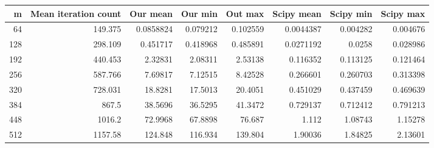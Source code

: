 \begin{tabular}{rrrrrrrr}
\hline
   m &   Mean iteration count &    Our mean &    Our min &    Out max &   Scipy mean &   Scipy min &   Scipy max \\
\hline
  64 &                149.375 &   0.0858824 &   0.079212 &   0.102559 &    0.0044387 &    0.004282 &    0.004676 \\
 128 &                298.109 &   0.451717  &   0.418968 &   0.485891 &    0.0271192 &    0.0258   &    0.028986 \\
 192 &                440.453 &   2.32831   &   2.08311  &   2.53138  &    0.116352  &    0.113125 &    0.121464 \\
 256 &                587.766 &   7.69817   &   7.12515  &   8.42528  &    0.266601  &    0.260703 &    0.313398 \\
 320 &                728.031 &  18.8281    &  17.5013   &  20.4051   &    0.451029  &    0.437459 &    0.469639 \\
 384 &                867.5   &  38.5696    &  36.5295   &  41.3472   &    0.729137  &    0.712412 &    0.791213 \\
 448 &               1016.2   &  72.9968    &  67.8898   &  76.687    &    1.112     &    1.08743  &    1.15278  \\
 512 &               1157.58  & 124.848     & 116.934    & 139.804    &    1.90036   &    1.84825  &    2.13601  \\
\hline
\end{tabular}